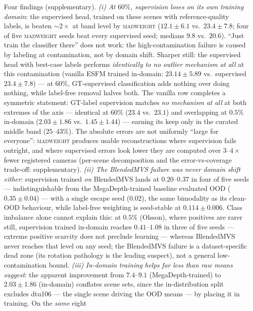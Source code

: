 \documentclass[10pt,twocolumn,letterpaper]{article}
\newcommand{\mad}{\textsc{madweight}}
\begin{document}
Four findings (supplementary). \emph{(i) At $60\%$, supervision loses on its own training domain}: the
supervised head, trained on these scenes with reference-quality labels, is beaten
$\sim\!2\times$ at band level by \mad{} ($12.1\pm6.1$ vs.\ $23.4\pm7.8$; four of five
\mad{} seeds beat every supervised seed; medians $9.8$ vs.\ $20.6$). ``Just train the
classifier there'' does not work: the high-contamination failure is caused by labeling at
contamination, not by domain shift. Sharper still: the supervised head with best-case labels performs
\emph{identically to no outlier mechanism at all} at this contamination (vanilla ESFM
trained in-domain: $23.14\pm5.89$ vs.\ supervised $23.4\pm7.8$) --- at $60\%$,
GT-supervised classification adds nothing over doing nothing, while label-free removal
halves both. The vanilla row completes a symmetric statement: GT-label supervision
matches \emph{no mechanism at all} at both extremes of the axis --- identical at
$60\%$ ($23.4$ vs.\ $23.1$) and overlapping at $0.5\%$ in-domain ($2.03\pm1.86$
vs.\ $1.45\pm1.44$) --- earning its keep only in the curated middle band
($25$--$43\%$). The absolute errors are not uniformly ``large for everyone'': \mad{} produces usable
reconstructions where supervision fails outright, and where supervised errors look lower
they are computed over $3$--$4\times$ fewer registered cameras (per-scene decomposition
and the error-vs-coverage trade-off: supplementary). \emph{(ii) The BlendedMVS failure was never domain
shift either}: supervision trained \emph{on} BlendedMVS lands at $0.20$--$0.37$ in four
of five seeds --- indistinguishable from the MegaDepth-trained baseline evaluated OOD
($0.35\pm0.04$) --- with a single escape seed ($0.02$), the same bimodality as its
clean-OOD behaviour, while label-free weighting is seed-stable at $0.114\pm0.006$.
Class imbalance alone cannot explain this: at $0.5\%$ (Olsson), where positives are
rarer still, supervision trained in-domain reaches $0.41$--$1.08$ in three of five
seeds --- extreme positive scarcity does not preclude learning --- whereas BlendedMVS
never reaches that level on any seed; the BlendedMVS failure is a dataset-specific
dead zone (its rotation pathology is the leading suspect), not a general
low-contamination bound. \emph{(iii) In-domain training helps far less than raw means suggest}: the apparent
improvement from $7.4$--$9.1$ (MegaDepth-trained) to $2.03\pm1.86$ (in-domain)
conflates scene sets, since the in-distribution split excludes dtu106 --- the single
scene driving the OOD means --- by placing it in training. On the \emph{same} eight
\end{document}
